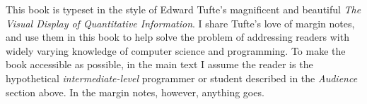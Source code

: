 This book is typeset in the style of Edward Tufte's
magnificent and beautiful \emph{The Visual Display of
  Quantitative Information}\cite{Tufte:1986:VDQ:33404}.  I share
Tufte's love of margin notes, and use them in this book to help solve the problem of addressing readers with
widely varying knowledge of computer science and programming.
%
To make the book accessible as possible, in the main text I assume the
reader is the hypothetical \emph{intermediate-level} programmer or
student described in the \emph{Audience} section above.
%
In the margin notes, however, anything goes.






%
%
%
%
%
%
%
%




